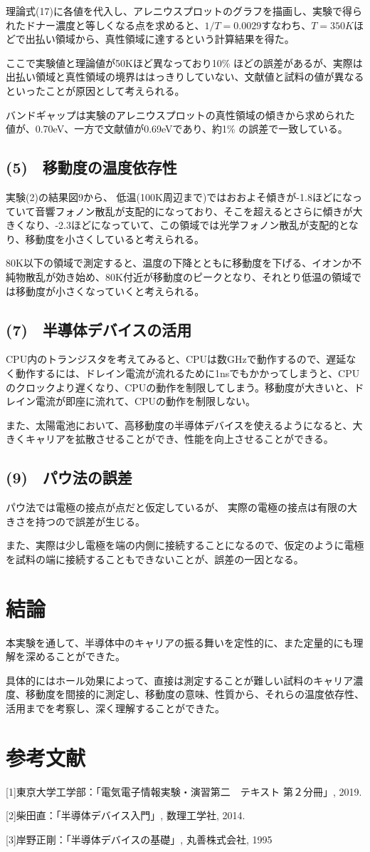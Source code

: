 \documentclass[dvipdfmx]{jsarticle}
\begin{document}
理論式(17)に各値を代入し、アレニウスプロットのグラフを描画し、実験で得られたドナー濃度と等しくなる点を求めると、$1/T = 0.0029$すなわち、$T = 350K$ほどで出払い領域から、真性領域に達するという計算結果を得た。

ここで実験値と理論値が50Kほど異なっており10\% ほどの誤差があるが、実際は出払い領域と真性領域の境界ははっきりしていない、文献値と試料の値が異なるといったことが原因として考えられる。

バンドギャップは実験のアレニウスプロットの真性領域の傾きから求められた値が、0.70eV、一方で文献値が0.69eVであり、約1\% の誤差で一致している。
\subsection*{(5)　移動度の温度依存性}
実験(2)の結果図9から、
低温(100K周辺まで)ではおおよそ傾きが-1.8ほどになっていて音響フォノン散乱が支配的になっており、そこを超えるとさらに傾きが大きくなり、-2.3ほどになっていて、この領域では光学フォノン散乱が支配的となり、移動度を小さくしていると考えられる。

80K以下の領域で測定すると、温度の下降とともに移動度を下げる、イオンか不純物散乱が効き始め、80K付近が移動度のピークとなり、それとり低温の領域では移動度が小さくなっていくと考えられる。

\subsection*{(7)　半導体デバイスの活用}
CPU内のトランジスタを考えてみると、CPUは数GHzで動作するので、遅延なく動作するには、ドレイン電流が流れるために1nsでもかかってしまうと、CPUのクロックより遅くなり、CPUの動作を制限してしまう。移動度が大きいと、ドレイン電流が即座に流れて、CPUの動作を制限しない。

また、太陽電池において、高移動度の半導体デバイスを使えるようになると、大きくキャリアを拡散させることができ、性能を向上させることができる。

\subsection*{(9)　パウ法の誤差}
パウ法では電極の接点が点だと仮定しているが、
実際の電極の接点は有限の大きさを持つので誤差が生じる。

また、実際は少し電極を端の内側に接続することになるので、仮定のように電極を試料の端に接続することもできないことが、誤差の一因となる。

\section{結論}

本実験を通して、半導体中のキャリアの振る舞いを定性的に、また定量的にも理解を深めることができた。

具体的にはホール効果によって、直接は測定することが難しい試料のキャリア濃度、移動度を間接的に測定し、移動度の意味、性質から、それらの温度依存性、活用までを考察し、深く理解することができた。

\section{参考文献}
[1]東京大学工学部：「電気電子情報実験・演習第二　テキスト 第２分冊」, 2019.

[2]柴田直：「半導体デバイス入門」, 数理工学社, 2014.

[3]岸野正剛：「半導体デバイスの基礎」, 丸善株式会社, 1995
\end{document}
